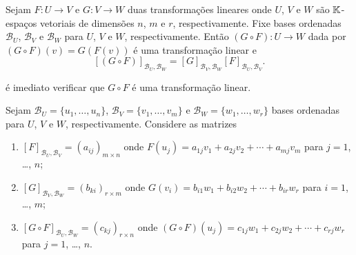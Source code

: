 \begin{teorema}\label{matriz_da_composicao_de_transformacoes}
  Sejam $F \colon U \to V$ e $G \colon V \to W$ duas transformações lineares onde $U$, $V$ e $W$ são $\mathbb{K}$-espaços vetoriais de dimensões $n$, $m$ e $r$, respectivamente. Fixe bases ordenadas $\mathcal{B}_U$, $\mathcal{B}_V$ e $\mathcal{B}_W$ para $U$, $V$ e $W$, respectivamente. Então $(G \circ F) \colon U \to W$ dada por $(G\circ F)(v) = G(F(v))$ é uma transformação linear e
  \[
    [(G \circ F)]_{{\mathcal{B}_U},{\mathcal{B}_W}} = [G]_{{\mathcal{B}_V},{\mathcal{B}_W}}[F]_{{\mathcal{B}_U},{\mathcal{B}_V}}.
  \]
\end{teorema}
\begin{prova}
  é imediato verificar que $G\circ F$ é uma transformação linear.

  Sejam $\mathcal{B}_U = \{u_1,\dots,u_n\}$, $\mathcal{B}_V = \{v_1,\dots,v_m\}$ e $\mathcal{B}_W = \{w_1,\dots,w_r\}$ bases ordenadas para $U$, $V$ e $W$, respectivamente. Considere as matrizes
  \begin{enumerate}[label=({\arabic*})]
    \item $[F]_{{\mathcal{B}_U},{\mathcal{B}_V}} = (a_{ij})_{m\times n}$ onde $F(u_j) = a_{1j}v_1 + a_{2j}v_2 + \cdots + a_{mj}v_m$ para $j=1$, \dots, $n$;

    \item $[G]_{{\mathcal{B}_V},{\mathcal{B}_W}} = (b_{ki})_{r\times m}$ onde $G(v_i) = b_{i1}w_1 + b_{i2}w_2 + \cdots + b_{ir}w_r$ para $i=1$, \dots, $m$;

    \item $[G \circ F]_{{\mathcal{B}_U},{\mathcal{B}_W}} = (c_{kj})_{r\times n}$ onde $(G\circ F)(u_j) = c_{1j}w_1 + c_{2j}w_2 + \cdots + c_{rj}w_r$ para $j=1$, \dots, $n$.
  \end{enumerate}


\end{prova}
